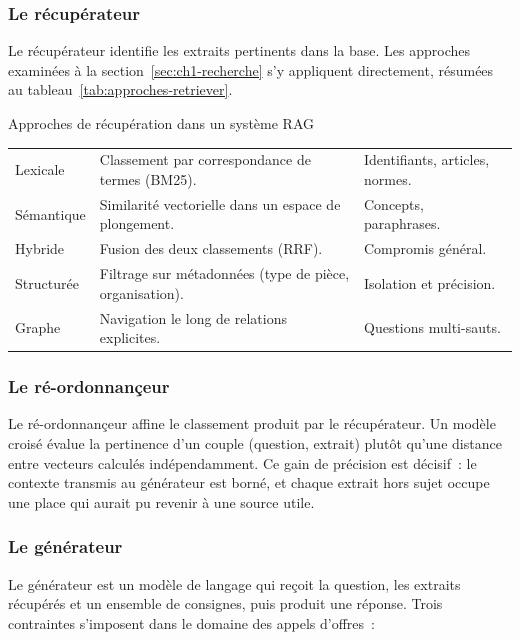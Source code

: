 \subsubsection{Le récupérateur}

Le récupérateur identifie les extraits pertinents dans la base. Les approches
examinées à la section~\ref{sec:ch1-recherche} s'y appliquent directement,
résumées au tableau~\ref{tab:approches-retriever}.

\begin{btptable}{Approches de récupération dans un système RAG}
\label{tab:approches-retriever}
\begin{tabularx}{\linewidth}{@{}L{2.6cm} Y L{3.4cm}@{}}
\toprule
{}
 &  &  \\
\midrule
Lexicale & Classement par correspondance de termes (BM25). & Identifiants, articles, normes. \\
Sémantique & Similarité vectorielle dans un espace de plongement. & Concepts, paraphrases. \\
Hybride & Fusion des deux classements (RRF). & Compromis général. \\
Structurée & Filtrage sur métadonnées (type de pièce, organisation). & Isolation et précision. \\
Graphe & Navigation le long de relations explicites. & Questions multi-sauts. \\
\bottomrule
\end{tabularx}
\end{btptable}

\subsubsection{Le ré-ordonnançeur}

Le ré-ordonnançeur affine le classement produit par le récupérateur. Un modèle
croisé évalue la pertinence d'un couple (question, extrait) plutôt qu'une
distance entre vecteurs calculés indépendamment. Ce gain de précision est
décisif~: le contexte transmis au générateur est borné, et chaque extrait
hors sujet occupe une place qui aurait pu revenir à une source utile.

\subsubsection{Le générateur}

Le générateur est un modèle de langage qui reçoit la question, les extraits
récupérés et un ensemble de consignes, puis produit une réponse. Trois
contraintes s'imposent dans le domaine des appels d'offres~:

